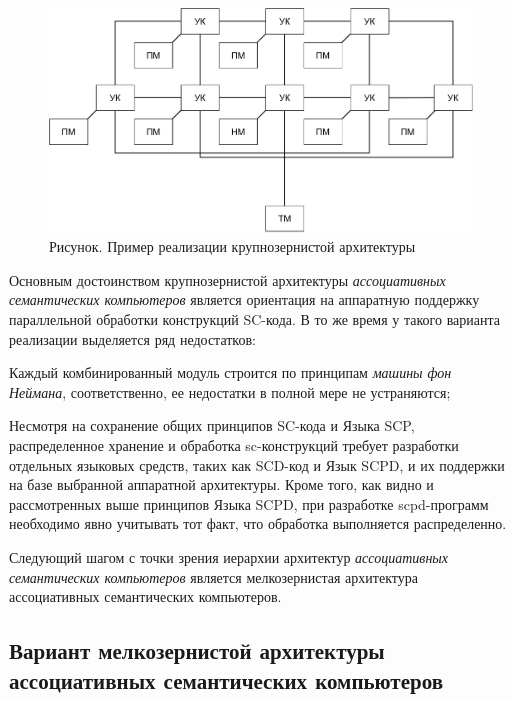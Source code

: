 \begin{figure}[H]
	\includegraphics[scale=0.7]{images/part6/chapter_computer/coarse-grained architecture.pdf}
	\caption{Рисунок. Пример реализации крупнозернистой архитектуры}
	\label{fig:coarse-grained-architecture}
\end{figure}

Основным достоинством крупнозернистой архитектуры \textit{ассоциативных семантических компьютеров} является ориентация на аппаратную поддержку параллельной обработки конструкций SC-кода. В то же время у такого варианта реализации выделяется ряд недостатков:
\begin{textitemize}
	\item Каждый комбинированный модуль строится по принципам \textit{машины фон Неймана}, соответственно, ее недостатки в полной мере не устраняются;
	\item Несмотря на сохранение общих принципов SC-кода и Языка SCP, распределенное хранение и обработка sc-конструкций требует разработки отдельных языковых средств, таких как SCD-код и Язык SCPD, и их поддержки на базе выбранной аппаратной архитектуры. Кроме того, как видно и рассмотренных выше принципов Языка SCPD, при разработке scpd-программ необходимо явно учитывать тот факт, что обработка выполняется распределенно.
\end{textitemize}	

Следующий шагом с точки зрения иерархии архитектур \textit{ассоциативных семантических компьютеров} является мелкозернистая архитектура ассоциативных семантических компьютеров.

\subsection{Вариант мелкозернистой архитектуры ассоциативных семантических компьютеров}
\label{subsec_comp_fine}

